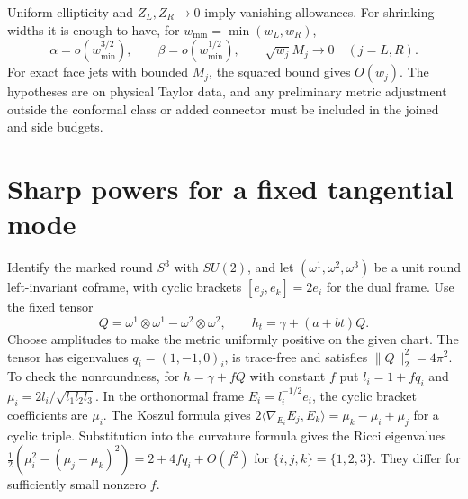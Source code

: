 \documentclass[11pt,letterpaper]{article}
\numberwithin{equation}{section}
\newcommand{\rd}{\gamma}
\begin{document}
Uniform ellipticity and \(Z_L,Z_R\to0\) imply vanishing allowances.
For shrinking widths it is enough to have, for
\(w_{\min}=\min(w_L,w_R)\),
\[
 \alpha=o(w_{\min}^{3/2}),\qquad \beta=o(w_{\min}^{1/2}),\qquad
 \sqrt{w_j}M_j\longrightarrow0\quad(j=L,R).
\]
For exact face jets with bounded \(M_j\), the squared bound gives
\(O(w_j)\). The hypotheses are on physical Taylor data, and any
preliminary metric adjustment outside the conformal class or
added connector must be included in the joined and side budgets.

\section{Sharp powers for a fixed tangential mode}\label{sec:fixed-mode}

Identify the marked round \(S^3\) with \(SU(2)\), and let
\((\omega^1,\omega^2,\omega^3)\) be a unit round left-invariant
coframe, with cyclic brackets \([e_j,e_k]=2e_i\) for the dual
frame. Use the fixed tensor
\[
 Q=\omega^1\otimes\omega^1-\omega^2\otimes\omega^2,\qquad
 h_t=\rd+(a+bt)Q .
\]
Choose amplitudes to make the metric uniformly positive on the
given chart. The tensor has eigenvalues \(q_i=(1,-1,0)_i\), is
trace-free and satisfies \(\|Q\|_2^2=4\pi^2\). To check the
nonroundness, for \(h=\rd+fQ\) with constant \(f\) put
\(l_i=1+fq_i\) and \(\mu_i=2l_i/\sqrt{l_1l_2l_3}\).
In the orthonormal frame \(E_i=l_i^{-1/2}e_i\), the cyclic
bracket coefficients are \(\mu_i\). The Koszul formula gives
\(2\langle\nabla_{E_i}E_j,E_k\rangle=\mu_k-\mu_i+\mu_j\)
for a cyclic triple. Substitution into the curvature formula
gives the Ricci eigenvalues
\(\tfrac12(\mu_i^2-(\mu_j-\mu_k)^2)=2+4f q_i+O(f^2)\)
for \(\{i,j,k\}=\{1,2,3\}\). They differ for sufficiently
small nonzero \(f\).
\end{document}

